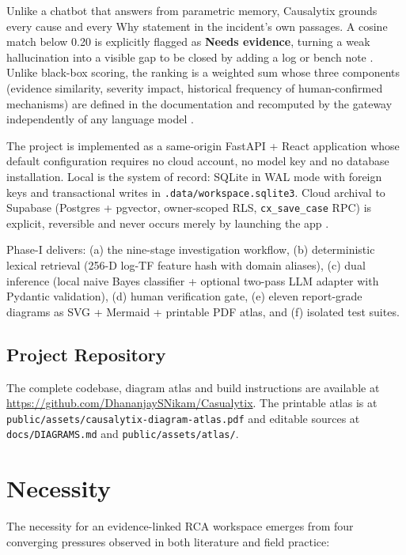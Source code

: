 \documentclass[12pt,a4paper,oneside]{report}
\begin{document}
Unlike a chatbot that answers from parametric memory, Causalytix grounds every cause and every Why statement in the incident's own passages. A cosine match below 0.20 is explicitly flagged as \textbf{Needs evidence}, turning a weak hallucination into a visible gap to be closed by adding a log or bench note \cite{lewis2020rag,gao2023retrieval,zhao2024retrieval}. Unlike black-box scoring, the ranking is a weighted sum whose three components (evidence similarity, severity impact, historical frequency of human-confirmed mechanisms) are defined in the documentation and recomputed by the gateway independently of any language model \cite{chen2020microscope,brandherm2022causeinfer}.

The project is implemented as a same-origin FastAPI + React application whose default configuration requires no cloud account, no model key and no database installation. Local is the system of record: SQLite in WAL mode with foreign keys and transactional writes in \texttt{.data/workspace.sqlite3}. Cloud archival to Supabase (Postgres + pgvector, owner-scoped RLS, \texttt{cx\_save\_case} RPC) is explicit, reversible and never occurs merely by launching the app \cite{ma2020automating}.

Phase-I delivers: (a) the nine-stage investigation workflow, (b) deterministic lexical retrieval (256-D log-TF feature hash with domain aliases), (c) dual inference (local naive Bayes classifier + optional two-pass LLM adapter with Pydantic validation), (d) human verification gate, (e) eleven report-grade diagrams as SVG + Mermaid + printable PDF atlas, and (f) isolated test suites.

\subsection*{Project Repository}
The complete codebase, diagram atlas and build instructions are available at \url{https://github.com/DhananjaySNikam/Casualytix}. The printable atlas is at \texttt{public/assets/causalytix-diagram-atlas.pdf} and editable sources at \texttt{docs/DIAGRAMS.md} and \texttt{public/assets/atlas/}.

\section{Necessity}
\label{sec:necessity}

The necessity for an evidence-linked RCA workspace emerges from four converging pressures observed in both literature and field practice:
\end{document}
